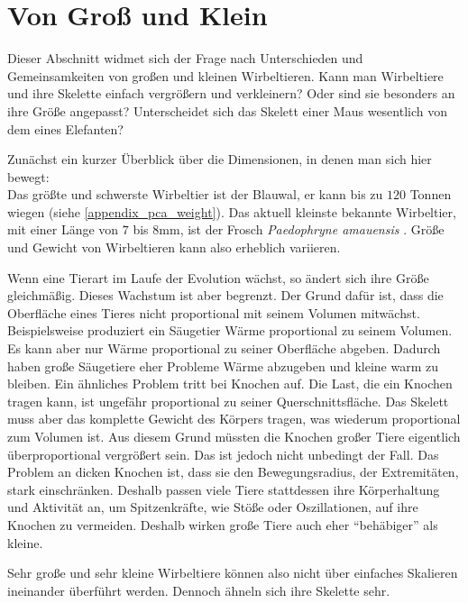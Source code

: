 \section{Von Groß und Klein}
\label{bigAndSmall}

Dieser Abschnitt widmet sich der Frage nach Unterschieden und Gemeinsamkeiten von großen und kleinen Wirbeltieren. Kann man Wirbeltiere und ihre Skelette einfach vergrößern und verkleinern? Oder sind sie besonders an ihre Größe angepasst? Unterscheidet sich das Skelett einer Maus wesentlich von dem eines Elefanten?

Zunächst ein kurzer Überblick über die Dimensionen, in denen man sich hier bewegt:\\
Das größte und schwerste Wirbeltier ist der Blauwal, er kann bis zu $120$ Tonnen wiegen (siehe \ref{appendix_pca_weight}). Das aktuell kleinste bekannte Wirbeltier, mit einer Länge von $7$ bis $8$mm, ist der Frosch \emph{Paedophryne amauensis} \cite{smallestVertebrate}. Größe und Gewicht von Wirbeltieren kann also erheblich variieren.

Wenn eine Tierart im Laufe der Evolution wächst, so ändert sich ihre Größe gleichmäßig. Dieses Wachstum ist aber begrenzt. Der Grund dafür ist, dass die Oberfläche eines Tieres nicht proportional mit seinem Volumen mitwächst. Beispielsweise produziert ein Säugetier Wärme proportional zu seinem Volumen. Es kann aber nur Wärme proportional zu seiner Oberfläche abgeben. Dadurch haben große Säugetiere eher Probleme Wärme abzugeben und kleine warm zu bleiben.
Ein ähnliches Problem tritt bei Knochen auf. Die Last, die ein Knochen tragen kann, ist ungefähr proportional zu seiner Querschnittsfläche. Das Skelett muss aber das komplette Gewicht des Körpers tragen, was wiederum proportional zum Volumen ist.
Aus diesem Grund müssten die Knochen großer Tiere eigentlich überproportional vergrößert sein. Das ist jedoch nicht unbedingt der Fall. Das Problem an dicken Knochen ist, dass sie den Bewegungsradius, \zb der Extremitäten, stark einschränken. Deshalb passen viele Tiere stattdessen ihre Körperhaltung und Aktivität an, um Spitzenkräfte, wie Stöße oder Oszillationen, auf ihre Knochen zu vermeiden. Deshalb wirken große Tiere auch eher "`behäbiger"' als kleine. \cite[Kapitel 23]{Vergleichende_Anatomie}

Sehr große und sehr kleine Wirbeltiere können also nicht über einfaches Skalieren ineinander überführt werden. Dennoch ähneln sich ihre Skelette sehr.


